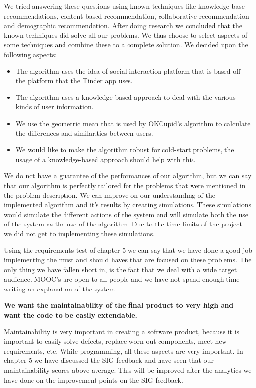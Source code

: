 We tried answering these questions using known techniques like knowledge-base recommendations, content-based recommendation, collaborative recommendation and demographic recommendation.
After doing research we concluded that the known techniques did solve all our problems.
We thus choose to select aspects of some techniques and combine these to a complete solution.
We decided upon the following aspects:
\begin{itemize}
\item The algorithm uses the idea of social interaction platform that is based off the platform that the Tinder app uses.
\item The algorithm uses a knowledge-based approach to deal with the various kinds of user information.
\item We use the geometric mean that is used by OKCupid's algorithm to calculate the differences and similarities between users.
\item We would like to make the algorithm robust for cold-start problems, the usage of a knowledge-based approach should help with this.
\end{itemize}

We do not have a guarantee of the performances of our algorithm, but we can say that our algorithm is perfectly tailored for the problems that were mentioned in the problem description.
We can improve on our understanding of the implemented algorithm and it's results by creating simulations.
These simulations would simulate the different actions of the system and will simulate both the use of the system as the use of the algorithm.
Due to the time limits of the project we did not get to implementing these simulations.

Using the requirements test of chapter 5 we can say that we have done a good job implementing the must and should haves that are focused on these problems.
The only thing we have fallen short in, is the fact that we deal with a wide target audience.
MOOC's are open to all people and we have not spend enough time writing an explanation of the system.

\textbf{We want the maintainability of the final product to very high and want the code to be easily extendable.}

Maintainability is very important in creating a software product, because it is important to easily solve defects, replace worn-out components, meet new requirements, etc.
While programming, all these aspects are very important.
In chapter 5 we have discussed the SIG feedback and have seen that our maintainability scores above average.
This will be improved after the analytics we have done on the improvement points on the SIG feedback.

